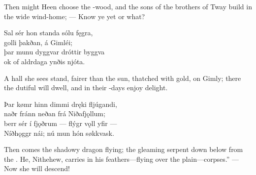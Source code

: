 \bvb Then might Heen choose the -wood, and the sons of the brothers of Tway build in the wide wind-home; — Know ye yet or what?\evb

\bva Sal sér hon standa \hld sólu fęgra, \\%
golli þakðan, \hld á Gimléi; \\%
þar munu dyggvar \hld dróttir byggva \\%
ok of aldrdaga \hld ynðis njóta.\eva

\bvb A hall she sees stand, fairer than the sun, thatched with gold, on Gimly; there the dutiful  will dwell, and in their -days enjoy delight.\evb

\bva Þar kømr hinn dimmi \hld dręki fljúgandi, \\%
naðr fránn neðan \hld frá Niðafjǫllum; \\%
berr sér í fjǫðrum \hld — flýgr vǫll yfir — \\%
Níðhǫggr nái; \hld nú mun hón søkkvask.\eva

\bvb Then comes the shadowy dragon flying; the gleaming serpent down below from the . He, Nithehew, carries in his feathers—flying over the plain—corpses.” — Now she will descend!\footnotemark[1]\evb
{}
